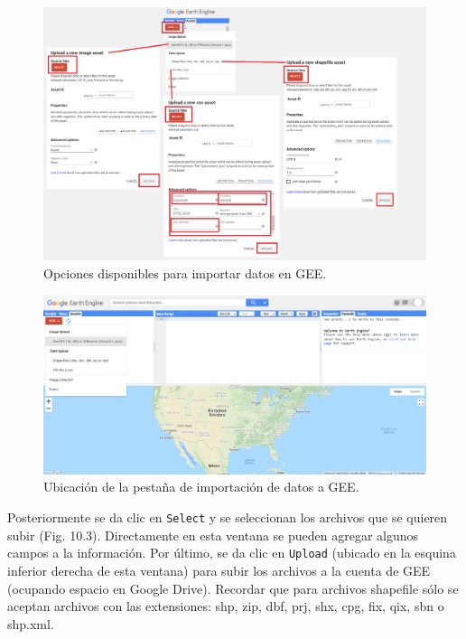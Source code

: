 \documentclass[
  12pt,
  letterpaper,
  twoside]{book}
\begin{document}
\begin{figure}[btp]

{\centering \includegraphics[width=1\linewidth]{Img/newAssets} 

}

\caption{Opciones disponibles para importar datos en GEE.}\label{fig:unnamed-chunk-174}
\end{figure}

\begin{figure}[btp]

{\centering \includegraphics[width=1\linewidth]{Img/Asset1} 

}

\caption{Ubicación de la pestaña de importación de datos a GEE.}\label{fig:unnamed-chunk-175}
\end{figure}

Posteriormente se da clic en \texttt{Select} y se seleccionan los archivos que se quieren subir (Fig. 10.3). Directamente en esta ventana se pueden agregar algunos campos a la información. Por último, se da clic en \texttt{Upload} (ubicado en la esquina inferior derecha de esta ventana) para subir los archivos a la cuenta de GEE (ocupando espacio en Google Drive). Recordar que para archivos shapefile sólo se aceptan archivos con las extensiones: shp, zip, dbf, prj, shx, cpg, fix, qix, sbn o shp.xml.
\end{document}
